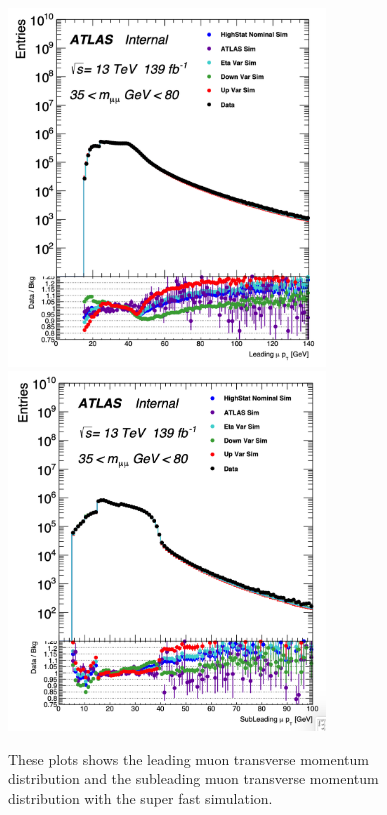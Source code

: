 \begin{figure}[!htb]
    \begin{center}
        \includegraphics[width=0.75\textwidth]{figures/chapter_dimuon/superfast_leadingMuonPT}
        \includegraphics[width=0.75\textwidth]{figures/chapter_dimuon/superfast_subleadingMuonPT}
        \caption{
        These plots shows the leading muon transverse momentum distribution and the subleading muon transverse momentum distribution with the super fast simulation.  }
    \end{center}
\end{figure}


